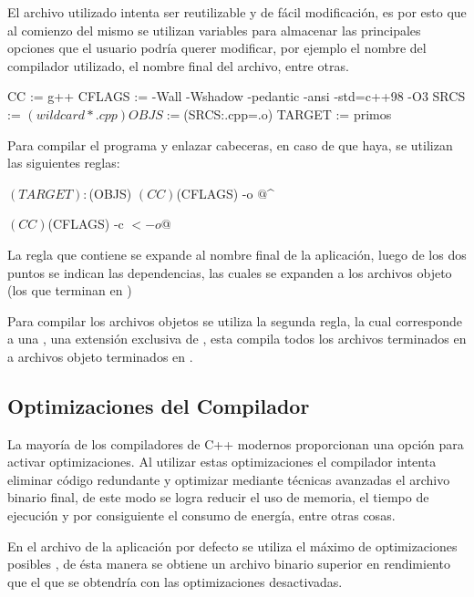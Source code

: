 \documentclass[12pt]{article}
\newenvironment{fullgrayverb}
{\verbbox}
{\endverbbox\par\colorbox{gray!25}{\parbox{\textwidth}{\theverbbox}}\par}
\begin{document}
El archivo  utilizado intenta ser reutilizable y de fácil
modificación, es por esto que al comienzo del mismo se utilizan variables para
almacenar las principales opciones que el usuario podría querer modificar, por
ejemplo el nombre del compilador utilizado, el nombre final del archivo, entre
otras.

\begin{fullgrayverb}[\mbox{}]
CC := g++
CFLAGS := -Wall -Wshadow -pedantic -ansi -std=c++98 -O3
SRCS := $(wildcard *.cpp)
OBJS := $(SRCS:.cpp=.o)
TARGET := primos
\end{fullgrayverb}

Para compilar el programa y enlazar cabeceras, en caso de que haya, se utilizan
las siguientes reglas:

\begin{fullgrayverb}[\mbox{}]
$(TARGET): $(OBJS)
    $(CC) $(CFLAGS) -o $@ $^

    $(CC) $(CFLAGS) -c $< -o $@
\end{fullgrayverb}

La regla que contiene  se expande al nombre final de la
aplicación, luego de los dos puntos se indican las dependencias, las cuales se
expanden a los archivos objeto (los que terminan en )

Para compilar los archivos objetos se utiliza la segunda regla, la cual
corresponde a una , una extensión exclusiva de , 
esta  compila todos los archivos terminados en  a
archivos objeto terminados en .

\subsection{Optimizaciones del Compilador}

La mayoría de los compiladores de C++ modernos proporcionan una opción para
activar optimizaciones. Al utilizar estas optimizaciones el compilador
intenta eliminar código redundante y optimizar mediante técnicas avanzadas el
archivo binario final, de este modo se logra reducir el uso de memoria, el
tiempo de ejecución y por consiguiente el consumo de energía, entre otras cosas.

En el archivo  de la aplicación por defecto se utiliza el máximo
de optimizaciones posibles , de ésta manera se obtiene un archivo
binario superior en rendimiento que el que se obtendría con las optimizaciones
desactivadas.
\end{document}
